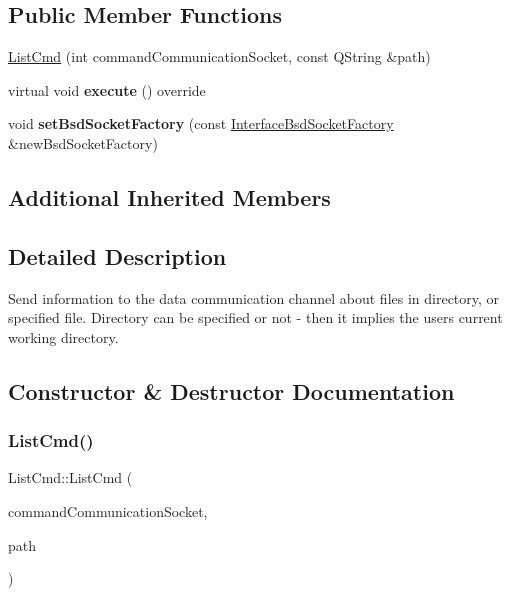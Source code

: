 \subsection*{Public Member Functions}
\begin{DoxyCompactItemize}
\item 
\hyperlink{classListCmd_a55f022f10e1c67886dcb1f388e792ccd}{List\+Cmd} (int command\+Communication\+Socket, const Q\+String \&path)
\item 
\mbox{\label{classListCmd_a70c2a805bc55b38b325d7866fc749771}} 
virtual void {\bfseries execute} () override
\item 
\mbox{\label{classListCmd_aaf08f313961ba78c646ede0d1acdeb86}} 
void {\bfseries set\+Bsd\+Socket\+Factory} (const \hyperlink{classInterfaceBsdSocketFactory}{Interface\+Bsd\+Socket\+Factory} \&new\+Bsd\+Socket\+Factory)
\end{DoxyCompactItemize}
\subsection*{Additional Inherited Members}


\subsection{Detailed Description}
Send information to the data communication channel about files in directory, or specified file. Directory can be specified or not -\/ then it implies the user\textquotesingle{}s current working directory. 

\subsection{Constructor \& Destructor Documentation}
\mbox{\label{classListCmd_a55f022f10e1c67886dcb1f388e792ccd}} 
\subsubsection{\texorpdfstring{List\+Cmd()}{ListCmd()}}
{\footnotesize\ttfamily List\+Cmd\+::\+List\+Cmd (\begin{DoxyParamCaption}\item[{int}]{command\+Communication\+Socket,  }\item[{const Q\+String \&}]{path }\end{DoxyParamCaption})}



